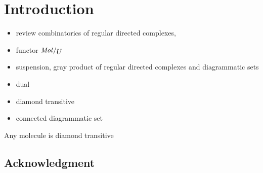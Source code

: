 \section*{Introduction}

\begin{itemize}
    \item review combinatorics of regular directed complexes, 
    \item functor \( \molecin{U} \)
    \item suspension, gray product of regular directed complexes and diagrammatic sets
    \item dual
    \item diamond transitive
    \item connected diagrammatic set
\end{itemize}

\begin{lem} \label{lem:diamond_transitive}
    Any molecule is diamond transitive
\end{lem}

\subsection*{Acknowledgment}

